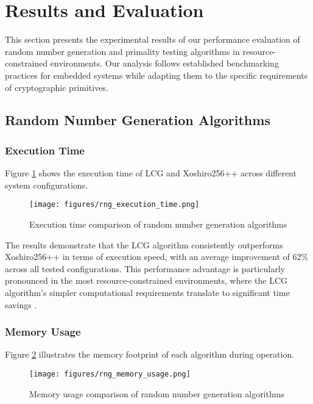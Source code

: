 \section{Results and Evaluation}

This section presents the experimental results of our performance evaluation of random number generation and primality testing algorithms in resource-constrained environments. Our analysis follows established benchmarking practices for embedded systems \cite{embedded_benchmarking} while adapting them to the specific requirements of cryptographic primitives.

\subsection{Random Number Generation Algorithms}

\subsubsection{Execution Time}
Figure \ref{fig:rng_execution_time} shows the execution time of LCG and Xoshiro256++ across different system configurations.

\begin{figure}[h]
\centering
\texttt{[image: figures/rng\_execution\_time.png]}
\caption{Execution time comparison of random number generation algorithms}
\label{fig:rng_execution_time}
\end{figure}

The results demonstrate that the LCG algorithm consistently outperforms Xoshiro256++ in terms of execution speed, with an average improvement of 62\% across all tested configurations. This performance advantage is particularly pronounced in the most resource-constrained environments, where the LCG algorithm's simpler computational requirements translate to significant time savings \cite{energy_efficient}.

\subsubsection{Memory Usage}
Figure \ref{fig:rng_memory_usage} illustrates the memory footprint of each algorithm during operation.

\begin{figure}[h]
\centering
\texttt{[image: figures/rng\_memory\_usage.png]}
\caption{Memory usage comparison of random number generation algorithms}
\label{fig:rng_memory_usage}
\end{figure}

